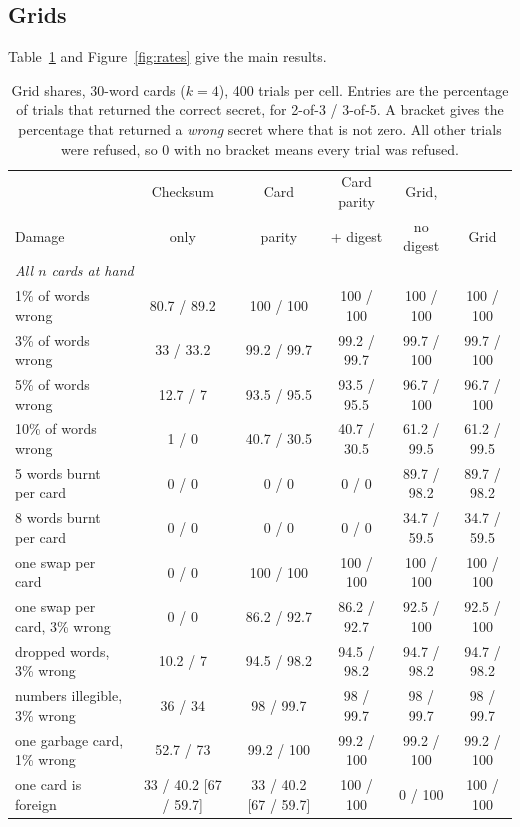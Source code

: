 \documentclass[numeric]{anvil-paper}
\begin{document}
\subsection{Grids}

Table~\ref{tab:grid} and Figure~\ref{fig:rates} give the main results.

\begin{table}[!htb]
\centering
\caption{Grid shares, 30-word cards ($k=4$), 400 trials per cell. Entries are
the percentage of trials that returned the correct secret, for 2-of-3 / 3-of-5.
A bracket gives the percentage that returned a \emph{wrong} secret where that
is not zero. All other trials were refused, so 0 with no bracket means every
trial was refused.}
\label{tab:grid}
\footnotesize
\setlength{\tabcolsep}{2.5pt}
\begin{tabular}{lccccc}
\toprule
 & Checksum & Card & Card parity & Grid, & \\
Damage & only & parity & + digest & no digest & Grid \\
\midrule
\multicolumn{6}{l}{\emph{All $n$ cards at hand}}\\
1\% of words wrong & 80.7 / 89.2 & 100 / 100 & 100 / 100 & 100 / 100 & 100 / 100 \\
3\% of words wrong & 33 / 33.2 & 99.2 / 99.7 & 99.2 / 99.7 & 99.7 / 100 & 99.7 / 100 \\
5\% of words wrong & 12.7 / 7 & 93.5 / 95.5 & 93.5 / 95.5 & 96.7 / 100 & 96.7 / 100 \\
10\% of words wrong & 1 / 0 & 40.7 / 30.5 & 40.7 / 30.5 & 61.2 / 99.5 & 61.2 / 99.5 \\
5 words burnt per card & 0 / 0 & 0 / 0 & 0 / 0 & 89.7 / 98.2 & 89.7 / 98.2 \\
8 words burnt per card & 0 / 0 & 0 / 0 & 0 / 0 & 34.7 / 59.5 & 34.7 / 59.5 \\
one swap per card & 0 / 0 & 100 / 100 & 100 / 100 & 100 / 100 & 100 / 100 \\
one swap per card, 3\% wrong & 0 / 0 & 86.2 / 92.7 & 86.2 / 92.7 & 92.5 / 100 & 92.5 / 100 \\
dropped words, 3\% wrong & 10.2 / 7 & 94.5 / 98.2 & 94.5 / 98.2 & 94.7 / 98.2 & 94.7 / 98.2 \\
numbers illegible, 3\% wrong & 36 / 34 & 98 / 99.7 & 98 / 99.7 & 98 / 99.7 & 98 / 99.7 \\
one garbage card, 1\% wrong & 52.7 / 73 & 99.2 / 100 & 99.2 / 100 & 99.2 / 100 & 99.2 / 100 \\
one card is foreign & 33 / 40.2 {\scriptsize[67 / 59.7]} & 33 / 40.2 {\scriptsize[67 / 59.7]} & 100 / 100 & 0 / 100 & 100 / 100 \\

\end{tabular}
\end{table}
\end{document}
